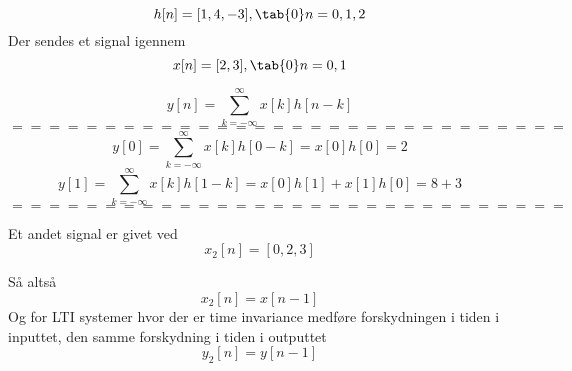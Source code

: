 \begin{rubrik}[Eksamenssæt2022]
    \begin{eksamensOpgave}
        \[h[n] = [1, 4, -3], \tab{0} n = 0, 1, 2\]
        Der sendes et signal igennem
        \[x[n] = [2, 3], \tab{0} n = 0, 1\]
        \begin{UnderOpgave}[Beregn y0 og y1]

            \[y[n]=\sum_{k =-\infty}^{\infty}x[k]h[n-k]\]
            \[==============================\]
            \[y[0] = \sum_{k =-\infty}^{\infty}x[k]h[0-k] = x[0]h[0] = 2\]
            \[y[1] = \sum_{k =-\infty}^{\infty}x[k]h[1-k] = x[0]h[1] + x[1]h[0] = 8 + 3\]
            \[==============================\]            
        \end{UnderOpgave}
        Et andet signal er givet ved
        \[x_2[n] = [0, 2, 3]\]
        \begin{UnderOpgave}
            Så altså 
            \[x_2[n] = x[n - 1]\]
            Og for LTI systemer hvor der er time invariance medføre forskydningen i tiden i inputtet, den samme forskydning i tiden i outputtet
            \[y_2[n] = y[n - 1]\]
            
            
        \end{UnderOpgave}


\end{eksamensOpgave}
\end{rubrik}
